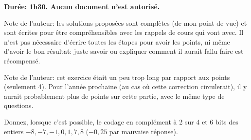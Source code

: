 \def\modulename{pcp}
\RequirePackage[utf8]{course}
\pcp
\newif\ifsolution
\solutionfalse

\usepackage{caption}
\usepackage{subcaption}
\usepackage{units}
\usepackage{listings}
\usepackage{Cdefs}
\usepackage{tikz}
\usetikzlibrary{arrows}


\def\consigne#1{\null\begin{center}\parbox{13cm}{\large #1}\end{center}\relax}

\def\Question#1#2{\question{}\textbf{(#2)} #1}
\ifsolution
\includecomment{solution}
\else
{}
\fi


\controlecontinu

\consigne{{\bf Dur{\'e}e: 1h30. Aucun document n'est autorisé.}}

\begin{solution}
  Note de l'auteur: les solutions proposées sont complètes (de mon
  point de vue) et sont écrites pour être compréhensibles avec les
  rappels de cours qui vont avec. Il n'est pas nécessaire d'écrire
  toutes les étapes pour avoir les points, ni même d'avoir le bon
  résultat: juste savoir ou expliquer comment il aurait fallu faire
  est récompensé.
\end{solution}

\vspace*{1em}


\begin{solution}
  Note de l'auteur: cet exercice était un peu trop long par rapport
  aux points (seulement 4).  Pour l'année prochaine (au cas où cette
  correction circulerait), il y aurait probablement plus de points sur
  cette partie, avec le même type de questions.
\end{solution}

\question Donnez, lorsque c'est possible, le codage en complément à 2
sur \(4\) et \(6\) bits des entiers \(-8,-7,-1,0,1,7,8\) (\(-0,25\)
par mauvaise réponse).


